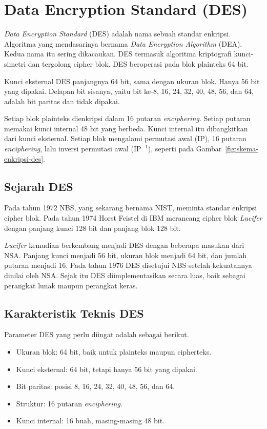 \section{Data Encryption Standard (DES)}

\textit{Data Encryption Standard} (DES) adalah nama sebuah standar enkripsi.
Algoritma yang mendasarinya bernama \textit{Data Encryption Algorithm} (DEA).
Kedua nama itu sering dikacaukan. DES termasuk algoritma kriptografi
kunci-simetri dan tergolong cipher blok. DES beroperasi pada blok plainteks
64 bit.

Kunci eksternal DES panjangnya 64 bit, sama dengan ukuran blok. Hanya 56 bit
yang dipakai. Delapan bit sisanya, yaitu bit ke-8, 16, 24, 32, 40, 48, 56, dan
64, adalah bit paritas dan tidak dipakai.

Setiap blok plainteks dienkripsi dalam 16 putaran \textit{enciphering}. Setiap
putaran memakai kunci internal 48 bit yang berbeda. Kunci internal itu
dibangkitkan dari kunci eksternal. Setiap blok mengalami permutasi awal (IP),
16 putaran \textit{enciphering}, lalu inversi permutasi awal
($\text{IP}^{-1}$), seperti pada Gambar~\ref{fig:skema-enkripsi-des}.

\subsection{Sejarah DES}
\label{sec:des-sejarah}

Pada tahun 1972 NBS, yang sekarang bernama NIST, meminta standar enkripsi
cipher blok. Pada tahun 1974 Horst Feistel di IBM merancang cipher blok
\textit{Lucifer} dengan panjang kunci 128 bit dan panjang blok 128 bit.

\textit{Lucifer} kemudian berkembang menjadi DES dengan beberapa masukan dari
NSA. Panjang kunci menjadi 56 bit, ukuran blok menjadi 64 bit, dan jumlah
putaran menjadi 16. Pada tahun 1976 DES disetujui NBS setelah kekuatannya
dinilai oleh NSA. Sejak itu DES diimplementasikan secara luas, baik sebagai
perangkat lunak maupun perangkat keras.

\subsection{Karakteristik Teknis DES}

Parameter DES yang perlu diingat adalah sebagai berikut.
\begin{itemize}
    \item Ukuran blok: 64 bit, baik untuk plainteks maupun cipherteks.
    \item Kunci eksternal: 64 bit, tetapi hanya 56 bit yang dipakai.
    \item Bit paritas: posisi 8, 16, 24, 32, 40, 48, 56, dan 64.
    \item Struktur: 16 putaran \textit{enciphering}.
    \item Kunci internal: 16 buah, masing-masing 48 bit.
\end{itemize}

